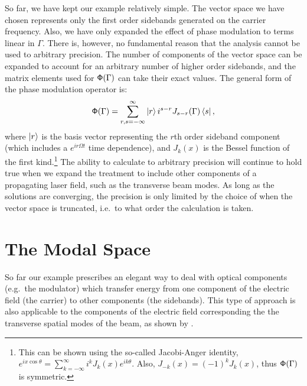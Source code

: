 So far, we have kept our example relatively simple. %
The vector space we have chosen represents only the first order sidebands generated on the carrier frequency. %
Also, we have only expanded the effect of phase modulation to terms linear in $\Gamma$. %
There is, however, no fundamental reason that the analysis cannot be used to arbitrary precision. %
The number of components of the vector space can be expanded to account for an arbitrary number of higher order sidebands, and the matrix elements used for $\mathsf{\Phi}(\Gamma)$ can take their exact values. %
The general form of the phase modulation operator is:
\begin{equation}
\mathsf{\Phi}(\Gamma) = \sum_{r,s=-\infty}^\infty\left| r \right> i^{s-r} J_{s-r}(\Gamma) \left< s \right|,
\end{equation}
where $\left| r \right>$ is the basis vector representing the $r$th order sideband component (which includes a $e^{ir\Omega t}$ time dependence), and $J_k(x)$ is the Bessel function of the first kind.\footnote{This can be shown using the so-called Jacobi-Anger identity, $e^{ix\cos\theta}=\sum_{k=-\infty}^\infty i^kJ_k(x)e^{ik\theta}$. %
Also, $J_{-k}(x)=(-1)^kJ_k(x)$, thus $\mathsf{\Phi}(\Gamma)$ is symmetric.} The ability to calculate to arbitrary precision will continue to hold true when we expand the treatment to include other components of a propagating laser field, such as the transverse beam modes. %
As long as the solutions are converging, the precision is only limited by the choice of when the vector space is truncated, i.e.\ to what order the calculation is taken.

\section{The Modal Space}
So far our example prescribes an elegant way to deal with optical components (e.g.\ the modulator) which transfer energy from one component of the electric field (the carrier) to other components (the sidebands). %
This type of approach is also applicable to the components of the electric field corresponding the the transverse spatial modes of the beam, as shown by \citet{Hefetz:97}.

